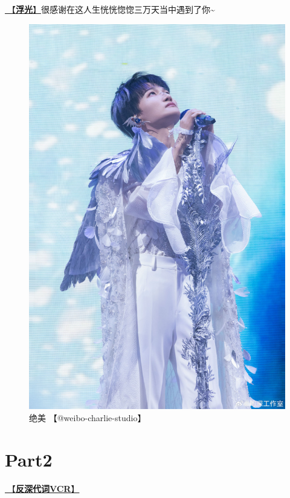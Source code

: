 \documentclass[]{ctexbook}
\begin{document}
\hyperref[floating-light]{🎵【\textbf{浮光}】}很感谢在这人生恍恍惚惚三万天当中遇到了你\textasciitilde{}

\begin{figure}

{\centering \includegraphics[width=400pt]{img/guiyang20240713/001} 

}

\caption{绝美 【@weibo-charlie-studio】}\label{fig:unnamed-chunk-61}
\end{figure}

\section{Part2}\label{guiyang-20240713-part2}

\hyperref[senself-vcr]{🎥【\textbf{反深代词VCR}】}
\end{document}
